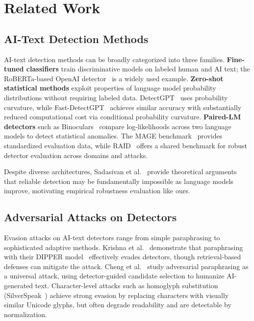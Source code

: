 \documentclass[11pt]{article}
\begin{document}
\section{Related Work}
\label{sec:related}

\subsection{AI-Text Detection Methods}

AI-text detection methods can be broadly categorized into three families. \textbf{Fine-tuned classifiers} train discriminative models on labeled human and AI text; the RoBERTa-based OpenAI detector~\cite{solaiman2019release} is a widely used example. \textbf{Zero-shot statistical methods} exploit properties of language model probability distributions without requiring labeled data. DetectGPT~\cite{mitchell2023detectgptzeroshotmachinegeneratedtext} uses probability curvature, while Fast-DetectGPT~\cite{bao2024fastdetectgptefficientzeroshotdetection} achieves similar accuracy with substantially reduced computational cost via conditional probability curvature. \textbf{Paired-LM detectors} such as Binoculars~\cite{hans2024spottingllmsbinocularszeroshot} compare log-likelihoods across two language models to detect statistical anomalies. The MAGE benchmark~\cite{li2024magemachinegeneratedtextdetection} provides standardized evaluation data, while RAID~\cite{dugan2024raidsharedbenchmarkrobust} offers a shared benchmark for robust detector evaluation across domains and attacks.

Despite diverse architectures, Sadasivan et al.~\cite{sadasivan2023aigenerated} provide theoretical arguments that reliable detection may be fundamentally impossible as language models improve, motivating empirical robustness evaluation like ours.

\subsection{Adversarial Attacks on Detectors}

Evasion attacks on AI-text detectors range from simple paraphrasing to sophisticated adaptive methods. Krishna et al.~\cite{krishna2023paraphrasing} demonstrate that paraphrasing with their DIPPER model~\cite{krishna2023dipper} effectively evades detectors, though retrieval-based defenses can mitigate the attack. Cheng et al.~\cite{cheng2025adversarialparaphrasinguniversalattack} study adversarial paraphrasing as a universal attack, using detector-guided candidate selection to humanize AI-generated text. Character-level attacks such as homoglyph substitution (SilverSpeak~\cite{creo2025silverspeakevadingaigeneratedtext}) achieve strong evasion by replacing characters with visually similar Unicode glyphs, but often degrade readability and are detectable by normalization.
\end{document}
